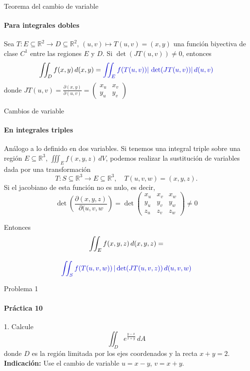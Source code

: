 \documentclass{plantillaPPT}
\begin{document}
\primeraDiapo

\begin{frame}{Teorema del cambio de variable}
\framesubtitle{Para integrales dobles}
\begin{teorema}
    Sea $T:E\subseteq\mathbb{R}^2\to D\subseteq\mathbb{R}^2$, $(u, v) \mapsto T(u,v) = (x,y)$ una función biyectiva de clase $C^1$ entre las regiones $E$ y $D$. Si $\det(JT(u,v))\neq0$, entonces
    \[
    \iint_Df(x,y)\,d(x,y) = {\color[rgb]{0, 0, 0.8} \iint_Ef(T(u,v))|\,\det(JT(u,v))|\,d(u,v)}
    \]
    \vspace{0.5cm}
    donde $\displaystyle JT(u,v) = \frac{\partial(x,y)}{\partial(u,v)} = \begin{pmatrix}
        x_u & x_v \\
        y_u & y_v
    \end{pmatrix}$
\end{teorema}
\end{frame}

\begin{frame}{Cambios de variable}
\framesubtitle{En integrales triples}

Análogo a lo definido en dos variables. Si tenemos una integral triple sobre una región $E\subseteq\mathbb{R}^3$, $\iiint_E f(x, y, z)\,dV$, podemos realizar la sustitución de variables dada por una transformación
\[
T:S\subseteq\mathbb{R}^3 \to E\subseteq\mathbb{R}^3, \quad T(u,v,w) = (x,y,z).
\]
Si el jacobiano de esta función no es nulo, es decir,
\[
\det\left(\frac{\partial(x,y,z)}{\partial(u,v,w}\right) = \det
\begin{pmatrix}
x_u&x_v&x_w \\
y_u&y_v&y_w\\
z_u&z_v&z_w
\end{pmatrix} \neq 0
\]
\end{frame}

\begin{frame}
Entonces
\begin{equation*}
\begin{gathered}
\iint_Ef(x,y,z)\,d(x,y,z) = \\[10pt]
{\color[rgb]{0,0,0.8} \iint_S f(T(u,v,w))\,|\det(JT(u,v,z))\,d(u,v,w)}
\end{gathered}
\end{equation*}
    
\end{frame}

\begin{frame}{Problema 1}
\framesubtitle{Práctica 10}
1. Calcule
\[
\iint_D e^{\frac{y-x}{x+y}}\,dA
\]
donde $D$ es la región limitada por los ejes coordenados y la recta $x+y=2$.
\textbf{Indicación: }Use el cambio de variable $u=x-y$, $v=x+y$.
\end{frame}
\end{document}

